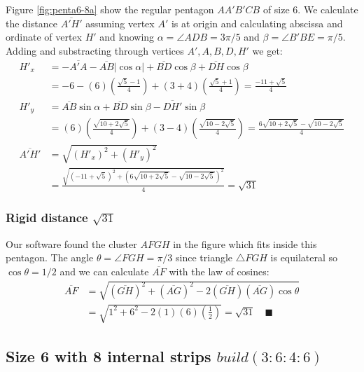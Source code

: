 \documentclass[11pt]{article}
\begin{document}
Figure \ref{fig:penta6-8a} show the regular pentagon $AA'B'CB$ of size $6$. We calculate the distance $\overline{A'H'}$ assuming vertex $A'$ is at origin and calculating abscissa and ordinate of vertex $H'$ and knowing $\alpha = \angle{ADB} = 3\pi / 5$ and $\beta = \angle{B'BE} = \pi / 5$. Adding and substracting through vertices $A',A,B,D,H'$ we get:
\begin{align}
H'_x &= -\overline{A'A} -\overline{AB}|\cos\alpha| + \overline{BD}\cos\beta + \overline{DH}\cos\beta \nonumber\\
 &= -6 -(6)\left(\frac{\sqrt5 - 1}4\right) + (3+4)\left(\frac{\sqrt5+1}4\right)
 = \frac{-11 + \sqrt5}4 \\
H'_y &= \overline{AB}\sin\alpha + \overline{BD}\sin\beta - \overline{DH'}\sin\beta \nonumber\\
 &= (6)\left(\frac{\sqrt{10+2\sqrt5}}4\right) + (3-4)\left(\frac{\sqrt{10-2\sqrt5}}4\right)
 = \frac{6\sqrt{10+2\sqrt5} - \sqrt{10-2\sqrt5}}4 \\
%
\overline{A'H'} &= \sqrt{(H'_x)^2 + (H'_y)^2} \nonumber\\
 &= \frac{\sqrt{(-11+\sqrt5)^2 + (6\sqrt{10+2\sqrt5} -\sqrt{10-2\sqrt5})^2}}4
 = \sqrt{31}
\end{align}

\subsubsection{Rigid distance $\sqrt{31}$}

Our software found the cluster $AFGH$ in the figure which fits inside this pentagon. The angle $\theta = \angle{FGH} = \pi / 3$ since triangle $\triangle{FGH}$ is equilateral so $\cos\theta = 1 / 2$ and we can calculate $\overline{AF}$ with the law of cosines:
\begin{align}
\overline{AF} &= \sqrt{(\overline{GH})^2 + (\overline{AG})^2 
 - 2(\overline{GH})(\overline{AG})\cos\theta} \nonumber\\
 &= \sqrt{1^2 + 6^2 - 2(1)(6)\left(\frac{1}2\right)} = \sqrt{31} \quad \blacksquare
\end{align}


\subsection{Size 6 with 8 internal strips $build(3:6:4:6)$}
\end{document}
